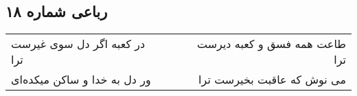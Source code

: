 \begin{center}
\section*{رباعی شماره ۱۸}
\label{sec:sh018}
\begin{longtable}{l p{0.5cm} r}
در کعبه اگر دل سوی غیرست ترا
&&
طاعت همه فسق و کعبه دیرست ترا
\\
ور دل به خدا و ساکن میکده‌ای
&&
می نوش که عاقبت بخیرست ترا
\\
\end{longtable}
\end{center}
